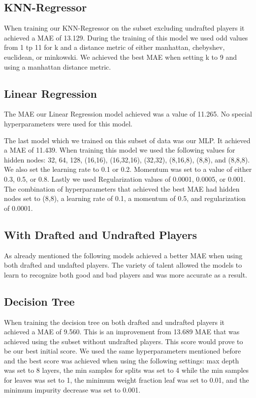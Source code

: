 \documentclass{article}
\begin{document}
\subsection{KNN-Regressor}

When training our KNN-Regressor on the subset excluding undrafted players it achieved a MAE of 13.129.
During the training of this model we used odd values from 1 tp 11 for k and a distance metric of either manhattan, chebyshev, euclidean, or minkowski.
We achieved the best MAE when setting k to 9 and using a manhattan distance metric.
\subsection{Linear Regression}
The MAE our Linear Regression model achieved was a value of 11.265.
No special hyperparameters were used for this model.


The last model which we trained on this subset of data was our MLP. It achieved a MAE of 11.439.
When training this model we used the following values for hidden nodes: 32, 64, 128, (16,16), (16,32,16), (32,32), (8,16,8), (8,8), and (8,8,8).
We also set the learning rate to 0.1 or 0.2. Momentum was set to a value of either 0.3, 0.5, or 0.8. 
Lastly we used Regularization values of 0.0001, 0.0005, or 0.001.
The combination of hyperparameters that achieved the best MAE had hidden nodes set to (8,8), a learning rate of 0.1,
a momentum of 0.5, and regularization of 0.0001.

\subsection{With Drafted and Undrafted Players}

As already mentioned the following models achieved a better MAE when using both drafted and undafted players. 
The variety of talent allowed the models to learn to recognize both good and bad players and was more accurate as a result.

\subsection{Decision Tree}

When training the decision tree on both drafted and undrafted players it achieved a MAE of 9.560. 
This is an improvement from 13.689 MAE that was achieved using the subset without undrafted players.
This score would prove to be our best initial score. We used the same hyperparameters mentioned before and the
best score was achieved when using the following settings: max depth was set to 8 layers, 
the min samples for splits was set to 4 while the min samples for leaves was set to 1, the minimum weight fraction leaf 
was set to 0.01, and the minimum impurity decrease was set to 0.001.
\end{document}

